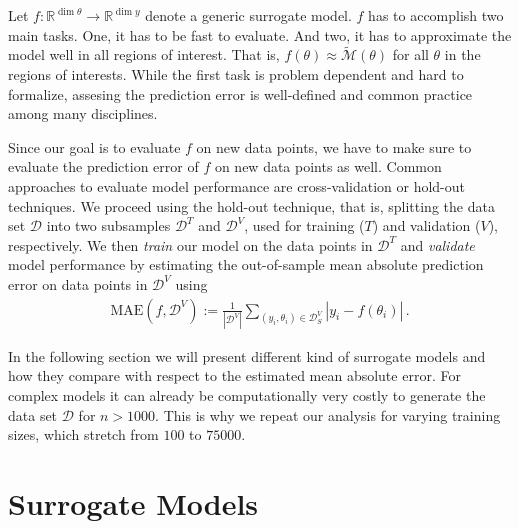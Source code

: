 \documentclass[a4paper, 12pt]{article}
\begin{document}
%

Let $f:\mathbb{R}^{\dim{\theta}} \to \mathbb{R}^{\dim{y}}$ denote a generic surrogate model.
$f$ has to accomplish two main tasks.
One, it has to be fast to evaluate.
And two, it has to approximate the model well in all regions of interest.
That is, $f(\theta) \approx \tilde{\mathcal{M}}(\theta)$ for all $\theta$ in the regions of interests.
While the first task is problem dependent and hard to formalize, assesing the prediction error is well-defined and common practice among many disciplines.

Since our goal is to evaluate $f$ on new data points, we have to make sure to evaluate the prediction error of $f$ on new data points as well.
Common approaches to evaluate model performance are cross-validation or hold-out techniques.
We proceed using the hold-out technique, that is, splitting the data set $\mathcal{D}$ into two subsamples $\mathcal{D}^{T}$ and $\mathcal{D}^{V}$, used for training ($T$) and validation ($V$), respectively.
We then \emph{train} our model on the data points in $\mathcal{D}^{T}$ and \emph{validate} model performance by estimating the out-of-sample mean absolute prediction error on data points in $\mathcal{D}^V$ using
\begin{align}
  \text{MAE}(f, \mathcal{D}^V) := \frac{1}{|\mathcal{D}^V|} \sum_{(y_i, \theta_i) \in \mathcal{D}_S^V} |y_i - f(\theta_i)| \,.
\end{align}

In the following section we will present different kind of surrogate models and how they compare with respect to the estimated mean absolute error.
For complex models it can already be computationally very costly to generate the data set $\mathcal{D}$ for $n > 1000$.
This is why we repeat our analysis for varying training sizes, which stretch from $100$ to $75000$.


\section{Surrogate Models}\label{sec:surrogate_models}
\end{document}
